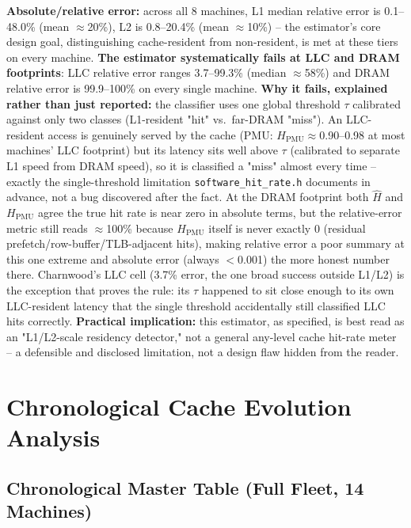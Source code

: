 \documentclass{article}
\begin{document}
\textbf{Absolute/relative error:} across all 8
machines, L1 median relative error is 0.1--48.0\% (mean $\approx$20\%), L2 is 0.8--20.4\%
(mean $\approx$10\%) -- the estimator's core design goal, distinguishing cache-resident from
non-resident, is met at these tiers on every machine. \textbf{The estimator systematically
fails at LLC and DRAM footprints}: LLC relative error ranges 3.7--99.3\% (median
$\approx$58\%) and DRAM relative error is 99.9--100\% on every single machine.
\textbf{Why it fails, explained rather than just reported:} the classifier uses one global
threshold $\tau$ calibrated against only two classes (L1-resident "hit" vs.\ far-DRAM
"miss"). An LLC-resident access is genuinely served by the cache (PMU: $H_{\text{PMU}}
\approx$0.90--0.98 at most machines' LLC footprint) but its latency sits well above $\tau$
(calibrated to separate L1 speed from DRAM speed), so it is classified a "miss" almost every
time -- exactly the single-threshold limitation \texttt{software\_hit\_rate.h} documents in
advance, not a bug discovered after the fact. At the DRAM footprint both $\widehat{H}$ and
$H_{\text{PMU}}$ agree the true hit rate is near zero in absolute terms, but the relative-error
metric still reads $\approx$100\% because $H_{\text{PMU}}$ itself is never exactly 0 (residual
prefetch/row-buffer/TLB-adjacent hits), making relative error a poor summary at this one
extreme and absolute error (always $<$0.001) the more honest number there. Charnwood's LLC
cell (3.7\% error, the one broad success outside L1/L2) is the exception that proves the rule:
its $\tau$ happened to sit close enough to its own LLC-resident latency that the single
threshold accidentally still classified LLC hits correctly. \textbf{Practical implication:}
this estimator, as specified, is best read as an "L1/L2-scale residency detector," not a
general any-level cache hit-rate meter -- a defensible and disclosed limitation, not a design
flaw hidden from the reader.

\section{Chronological Cache Evolution Analysis}
\label{sec:evolution}

\subsection{Chronological Master Table (Full Fleet, 14 Machines)}
\label{sec:master-table-full}
\end{document}
